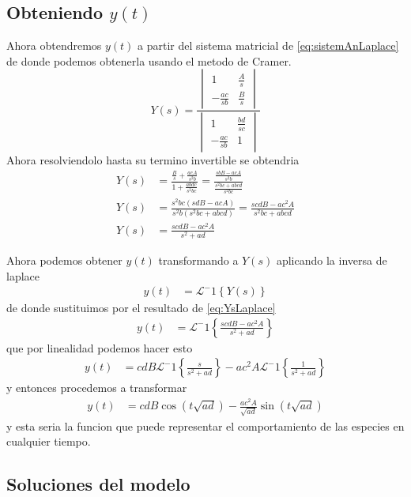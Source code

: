 \documentclass{report}
\begin{document}
\subsection{Obteniendo $y(t)$}
Ahora obtendremos $y(t)$ a partir del sistema matricial de \ref{eq:sistemAnLaplace} de donde podemos obtenerla usando el metodo de Cramer.
\begin{equation}
Y(s)=
\frac{
\begin{vmatrix}
1 &\frac{A}{s} \\
-\frac{ac}{sb} &\frac{B}{s}
\end{vmatrix}}{
\begin{vmatrix}
1 &\frac{bd}{sc}\\
-\frac{ac}{sb} &1
\end{vmatrix}}
\end{equation}
Ahora resolviendolo hasta su termino invertible se obtendria
\begin{align}
Y(s)&=\frac{\frac{B}{s}+\frac{acA}{s^2b}}{
1+\frac{abdc}{s^2bc}}
=
\frac{\frac{sbB-acA}{s^2b}}{
\frac{s^2bc+abcd}{s^2bc}}
\nonumber\\Y(s)&=
\frac{s^2bc(sdB-acA)}{s^2b(s^2bc+abcd)}
=
\frac{scdB-ac^2A}{s^2bc+abcd}
\nonumber\\Y(s)&=
\frac{scdB-ac^2A}{s^2+ad} \label{eq:YsLaplace}
\end{align}

Ahora podemos obtener $y(t)$ transformando a $Y(s)$ aplicando la inversa de laplace
\begin{align*}
y(t)&=\mathcal{L}^-1\left\{ Y(s) \right\}
\end{align*}
de donde sustituimos por el resultado de \ref{eq:YsLaplace} 
\begin{align*}
y(t)&=\mathcal{L}^-1\left\{ \frac{scdB-ac^2A}{s^2+ad} \right\}
\end{align*}
que por linealidad podemos hacer esto
\begin{align*}
y(t)&=cdB\mathcal{L}^-1\left\{ \frac{s}{s^2+ad} \right\}
-ac^2A\mathcal{L}^-1\left\{ \frac{1}{s^2+ad} \right\}
\end{align*}
y entonces procedemos a transformar
\begin{align}
y(t)&=cdB\cos(t\sqrt{ad})
-\frac{ac^2A}{\sqrt{ad}}\sin(t\sqrt{ad}) \label{eq:ytAn}
\end{align}
y esta seria la funcion que puede representar el comportamiento de las especies en cualquier tiempo.

\subsection{Soluciones del modelo}
\end{document}
